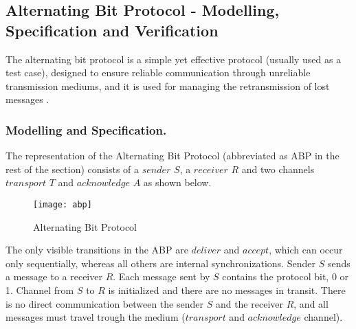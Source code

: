 \subsection{Alternating Bit Protocol - Modelling, Specification and Verification}

The alternating bit protocol is a simple yet effective protocol (usually used as a test case), designed to ensure reliable communication through unreliable transmission mediums, and it is used for managing the retransmission of lost messages \cite{ReactiveSystems}\cite{Kulick}.

\subsubsection{Modelling and Specification.}
The representation of the Alternating Bit Protocol (abbreviated as ABP in the rest of the section) consists of a $sender$ $S$, a $receiver$ $R$ and two channels $transport$ $T$ and $acknowledge$ $A$ as shown below. 

\begin{figure}[h]
\centering
\texttt{[image: abp]}
\caption{Alternating Bit Protocol}
\label{fig:abp}
\end{figure}

The only visible transitions in the ABP are $deliver$ and $accept$, which can occur only sequentially, whereas all others are internal synchronizations. Sender $S$ sends a message to a receiver $R$. Each message sent by $S$ contains the protocol bit, 0 or 1. Channel from $S$ to $R$ is initialized and there are no messages in transit. There is no direct communication between the sender $S$ and the receiver $R$, and all messages must travel trough the medium ($transport$ and $acknowledge$ channel). 

